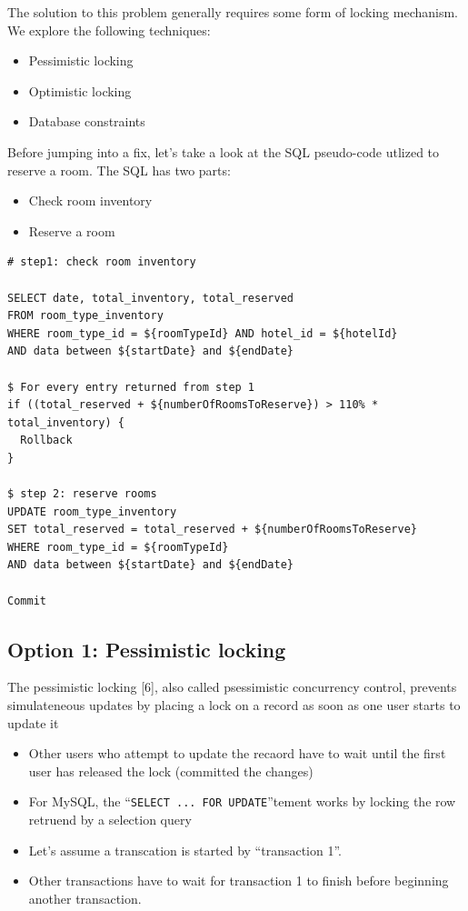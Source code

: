 \documentclass{report}
\theoremstyle{definition}
\let\oldsubsection\subsection
\renewcommand{\subsection}{\oldsubsection*}
\begin{document}
The solution to this problem generally requires some form of locking mechanism. We explore the following techniques:

\begin{itemize}
\item
Pessimistic locking
\item
Optimistic locking
\item
Database constraints
\end{itemize}

Before jumping into a fix, let's take a look at the SQL pseudo-code utlized to reserve a room. The SQL has two parts:

\begin{itemize}
\item
Check room inventory
\item
Reserve a room
\end{itemize}

\begin{lstlisting}
# step1: check room inventory

SELECT date, total_inventory, total_reserved
FROM room_type_inventory
WHERE room_type_id = ${roomTypeId} AND hotel_id = ${hotelId}
AND data between ${startDate} and ${endDate}

$ For every entry returned from step 1
if ((total_reserved + ${numberOfRoomsToReserve}) > 110% * total_inventory) {
  Rollback
}

$ step 2: reserve rooms
UPDATE room_type_inventory
SET total_reserved = total_reserved + ${numberOfRoomsToReserve}
WHERE room_type_id = ${roomTypeId}
AND data between ${startDate} and ${endDate}

Commit
\end{lstlisting}

\subsection{Option 1: Pessimistic locking}

The pessimistic locking [6], also called psessimistic concurrency control, prevents simulateneous updates by placing a lock on a record as soon as one user starts to update it

\begin{itemize}
\item
Other users who attempt to update the recaord have to wait until the first user has released the lock (committed the changes)
\item
For MySQL, the ``\lstinline{SELECT ... FOR UPDATE}''tement works by locking the row retruend by a selection query
\item
Let's assume a transcation is started by ``transaction 1''.

\item
Other transactions have to wait for transaction 1 to finish before beginning another transaction.
\end{itemize}
\end{document}
